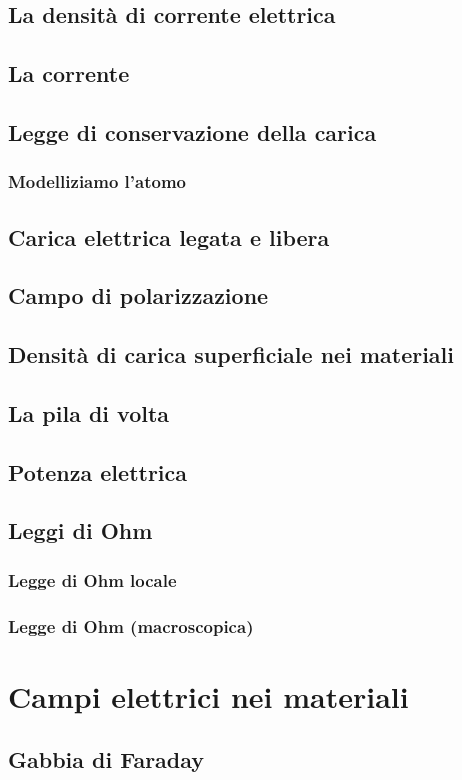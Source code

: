 \documentclass{book}
\begin{document}
\section{La densit\`a di corrente elettrica}
\section{La corrente}
\section{Legge di conservazione della carica}
\subsection{Modelliziamo l'atomo}
\section{Carica elettrica legata e libera}
\section{Campo di polarizzazione}
\section{Densit\`a di carica superficiale nei materiali}
\section{La pila di volta}
\section{Potenza elettrica}
\section{Leggi di Ohm}
\subsection{Legge di Ohm locale}
\subsection{Legge di Ohm (macroscopica)}

\chapter{Campi elettrici nei materiali}
\section{Gabbia di Faraday}
\end{document}
